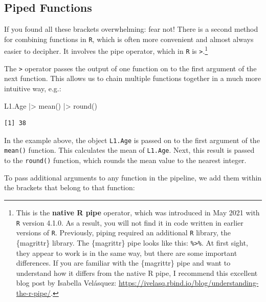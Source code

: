 \documentclass[
  letterpaper,
  DIV=11,
  numbers=noendperiod]{scrreprt}
\newenvironment{Shaded}{\begin{snugshade}}{\end{snugshade}}
\newcommand{\FunctionTok}[1]{\textcolor[rgb]{0.28,0.35,0.67}{#1}}
\newcommand{\NormalTok}[1]{\textcolor[rgb]{0.00,0.23,0.31}{#1}}
\newcommand{\SpecialCharTok}[1]{\textcolor[rgb]{0.37,0.37,0.37}{#1}}
\begin{document}
\subsection{Piped Functions}\label{sec-Piping}

If you found all these brackets overwhelming: fear not! There is a
second method for combining functions in \texttt{R}, which is often more
convenient and almost always easier to decipher. It involves the pipe
operator, which in \texttt{R} is
\texttt{\textbar{}\textgreater{}}.\footnote{This is the \textbf{native R
  pipe} operator, which was introduced in May 2021 with \texttt{R}
  version 4.1.0. As a result, you will not find it in code written in
  earlier versions of \texttt{R}. Previously, piping required an
  additional \texttt{R} library, the \{magrittr\} library. The
  \{magrittr\} pipe looks like this: \texttt{\%\textgreater{}\%}. At
  first sight, they appear to work is in the same way, but there are
  some important differences. If you are familiar with the \{magrittr\}
  pipe and want to understand how it differs from the native R pipe, I
  recommend this excellent blog post by Isabella Velásquez:
  \url{https://ivelasq.rbind.io/blog/understanding-the-r-pipe/}.}

The \texttt{\textbar{}\textgreater{}} operator passes the output of one
function on to the first argument of the next function. This allows us
to chain multiple functions together in a much more intuitive way, e.g.:

\begin{Shaded}
\begin{Highlighting}[]
\NormalTok{L1.Age }\SpecialCharTok{|\textgreater{}} 
 \FunctionTok{mean}\NormalTok{() }\SpecialCharTok{|\textgreater{}} 
 \FunctionTok{round}\NormalTok{()}
\end{Highlighting}
\end{Shaded}

\begin{verbatim}
[1] 38
\end{verbatim}

In the example above, the object \texttt{L1.Age} is passed on to the
first argument of the \texttt{mean()} function. This calculates the mean
of \texttt{L1.Age}. Next, this result is passed to the \texttt{round()}
function, which rounds the mean value to the nearest integer.

To pass additional arguments to any function in the pipeline, we add
them within the brackets that belong to that function:
\end{document}
